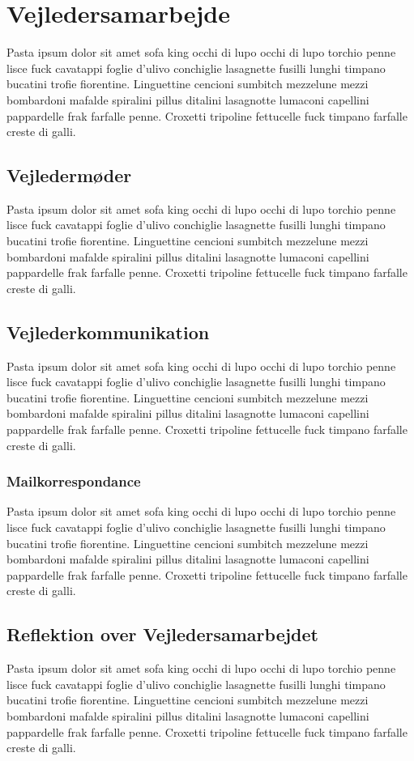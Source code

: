 \chapter{Vejledersamarbejde}
Pasta ipsum dolor sit amet sofa king occhi di lupo occhi di lupo torchio penne lisce fuck cavatappi foglie d'ulivo conchiglie lasagnette fusilli lunghi timpano bucatini trofie fiorentine. Linguettine cencioni sumbitch mezzelune mezzi bombardoni mafalde spiralini pillus ditalini lasagnotte lumaconi capellini pappardelle frak farfalle penne. Croxetti tripoline fettucelle fuck timpano farfalle creste di galli.

\section{Vejledermøder}
Pasta ipsum dolor sit amet sofa king occhi di lupo occhi di lupo torchio penne lisce fuck cavatappi foglie d'ulivo conchiglie lasagnette fusilli lunghi timpano bucatini trofie fiorentine. Linguettine cencioni sumbitch mezzelune mezzi bombardoni mafalde spiralini pillus ditalini lasagnotte lumaconi capellini pappardelle frak farfalle penne. Croxetti tripoline fettucelle fuck timpano farfalle creste di galli.

\section{Vejlederkommunikation}
Pasta ipsum dolor sit amet sofa king occhi di lupo occhi di lupo torchio penne lisce fuck cavatappi foglie d'ulivo conchiglie lasagnette fusilli lunghi timpano bucatini trofie fiorentine. Linguettine cencioni sumbitch mezzelune mezzi bombardoni mafalde spiralini pillus ditalini lasagnotte lumaconi capellini pappardelle frak farfalle penne. Croxetti tripoline fettucelle fuck timpano farfalle creste di galli.

\subsection{Mailkorrespondance}
Pasta ipsum dolor sit amet sofa king occhi di lupo occhi di lupo torchio penne lisce fuck cavatappi foglie d'ulivo conchiglie lasagnette fusilli lunghi timpano bucatini trofie fiorentine. Linguettine cencioni sumbitch mezzelune mezzi bombardoni mafalde spiralini pillus ditalini lasagnotte lumaconi capellini pappardelle frak farfalle penne. Croxetti tripoline fettucelle fuck timpano farfalle creste di galli.

\section{Reflektion over Vejledersamarbejdet}
Pasta ipsum dolor sit amet sofa king occhi di lupo occhi di lupo torchio penne lisce fuck cavatappi foglie d'ulivo conchiglie lasagnette fusilli lunghi timpano bucatini trofie fiorentine. Linguettine cencioni sumbitch mezzelune mezzi bombardoni mafalde spiralini pillus ditalini lasagnotte lumaconi capellini pappardelle frak farfalle penne. Croxetti tripoline fettucelle fuck timpano farfalle creste di galli.